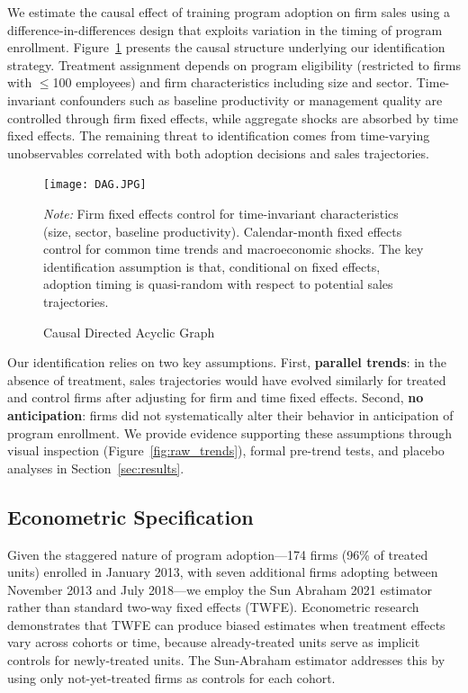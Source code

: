 \documentclass{article}
\begin{document}
We estimate the causal effect of training program adoption on firm sales using a difference-in-differences design that exploits variation in the timing of program enrollment. Figure~\ref{fig:dag} presents the causal structure underlying our identification strategy. Treatment assignment depends on program eligibility (restricted to firms with $\leq$100 employees) and firm characteristics including size and sector. Time-invariant confounders such as baseline productivity or management quality are controlled through firm fixed effects, while aggregate shocks are absorbed by time fixed effects. The remaining threat to identification comes from time-varying unobservables correlated with both adoption decisions and sales trajectories.

\begin{figure}[htbp]
\centering
\texttt{[image: DAG.JPG]}
\caption{Causal Directed Acyclic Graph}
\label{fig:dag}
\vspace{-0.5em}
{\small \textit{Note:} Firm fixed effects control for time-invariant characteristics (size, sector, baseline productivity). Calendar-month fixed effects control for common time trends and macroeconomic shocks. The key identification assumption is that, conditional on fixed effects, adoption timing is quasi-random with respect to potential sales trajectories.}
\end{figure}

Our identification relies on two key assumptions. First, \textbf{parallel trends}: in the absence of treatment, sales trajectories would have evolved similarly for treated and control firms after adjusting for firm and time fixed effects. Second, \textbf{no anticipation}: firms did not systematically alter their behavior in anticipation of program enrollment. We provide evidence supporting these assumptions through visual inspection (Figure~\ref{fig:raw_trends}), formal pre-trend tests, and placebo analyses in Section~\ref{sec:results}.

\subsection{Econometric Specification}

Given the staggered nature of program adoption—174 firms (96\% of treated units) enrolled in January 2013, with seven additional firms adopting between November 2013 and July 2018—we employ the Sun Abraham 2021 estimator rather than standard two-way fixed effects (TWFE). Econometric research demonstrates that TWFE can produce biased estimates when treatment effects vary across cohorts or time, because already-treated units serve as implicit controls for newly-treated units. The Sun-Abraham estimator addresses this by using only not-yet-treated firms as controls for each cohort.
\end{document}
